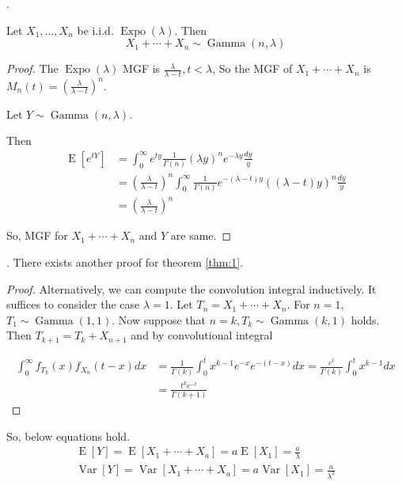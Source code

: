 \documentclass[8pt]{beamer}
\newcommand{\Expo}[1]{\operatorname{Expo}\!\left(#1\right)}
\newcommand{\expec}[1]{\operatorname{E}\left[ #1 \right]}
\newcommand{\Var}[1]{\operatorname{Var}\left[#1\right]}
\newcommand{\GammaDist}[2]{\operatorname{Gamma}\!\left(#1, #2\right)}
\begin{document}
\begin{frame}[allowframebreaks]{.}
    \begin{theorem}\label{thm:1}
        Let $X_1, \dots, X_n$ be i.i.d. $\Expo{\lambda}$. Then
        \[
            X_1 + \cdots + X_n \sim \GammaDist{n}{\lambda}
        \]
    \end{theorem}

    \begin{proof}
        The $\Expo{\lambda}$ MGF is $\frac{\lambda}{\lambda -t}, t<\lambda$, So the MGF of $X_1 + \cdots + X_n$ is $M_n(t) = (\frac{\lambda}{\lambda- t})^n$.

        Let $Y \sim \GammaDist{n}{\lambda}$.

        Then 
        \[
            \begin{aligned}
                \expec{e^{tY}}&=\int_0^\infty e^{ty} \frac{1}{\Gamma(n)} (\lambda y)^n e^{-\lambda y} \frac{dy}{y}\\
                &=\left(\frac{\lambda}{\lambda -t}\right)^n \int_0^\infty \frac{1}{\Gamma(n)} e^{-(\lambda -t)y} ((\lambda -t)y)^n \frac{dy}{y} \\
                &= \left(\frac{\lambda}{\lambda -t}\right)^n
            \end{aligned}
        \]

        So, MGF for $X_1 + \cdots + X_n$ and $Y$ are same.
    \end{proof}
\end{frame}

\begin{frame}{.}
    There exists another proof for theorem \ref{thm:1}.

    \begin{proof}
        Alternatively, we can compute the convolution integral inductively. 
        It suffices to consider the case $\lambda =1$.
        Let $T_n = X_1 + \cdots + X_n$.
        For $n=1$, $T_1 \sim \GammaDist{1}{1}$.
        Now suppose that $n=k, T_k \sim \GammaDist{k}{1}$ holds. Then
        $T_{k+1} = T_k +X_{n+1}$ and by convolutional integral

        \[
        \begin{aligned}
            \int_0^\infty f_{T_k}(x) f_{X_n}(t-x) dx&= \frac{1}{\Gamma(k)} \int_0^t x^{k-1} e^{-x} e^{-(t-x)} dx = \frac{e^t}{\Gamma(k)} \int_0^t x^{k-1} dx \\
            &= \frac{t^k e^{-t}}{\Gamma(k+1)}
        \end{aligned}
        \]
    \end{proof}

    So, below equations hold.
    \[
    \begin{gathered}
        \expec{Y} = \expec{X_1 + \cdots + X_a} = a \expec{X_1} = \frac{a}{\lambda} \\
        \Var{Y} = \Var{X_1 + \cdots + X_a} = a \Var{X_1} = \frac{a}{\lambda^2}
    \end{gathered}
    \]
\end{frame}
\end{document}
